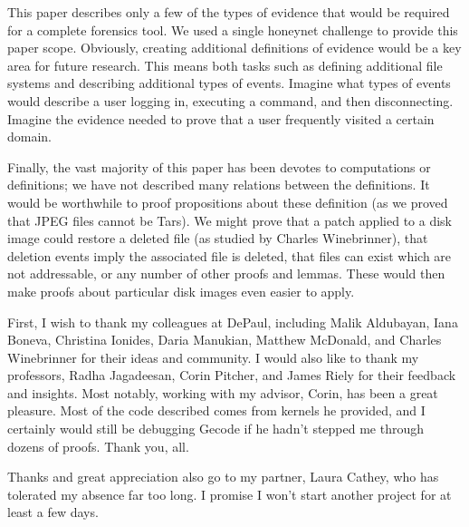 \documentclass[nocopyrightspace]{sigplanconf}
\begin{document}
This paper describes only a few of the types of evidence that would be
required for a complete forensics tool. We used a single honeynet challenge to
provide this paper scope. Obviously, creating additional definitions of
evidence would be a key area for future research. This means both tasks such
as defining additional file systems and describing additional types of events.
Imagine what types of events would describe a user logging in, executing a
command, and then disconnecting. Imagine the evidence needed to prove that a
user frequently visited a certain domain.

Finally, the vast majority of this paper has been devotes to computations or
definitions; we have not described many relations between the definitions. It
would be worthwhile to proof propositions about these definition (as we proved
that JPEG files cannot be Tars). We might prove that a patch applied to a disk
image could restore a deleted file (as studied by Charles Winebrinner), that
deletion events imply the associated file is deleted, that files can exist
which are not addressable, or any number of other proofs and lemmas. These
would then make proofs about particular disk images even easier to apply.

\acks
First, I wish to thank my colleagues at DePaul, including Malik Aldubayan,
Iana Boneva, Christina Ionides, Daria Manukian, Matthew McDonald, and Charles
Winebrinner for their ideas and community. I would also like to thank my
professors, Radha Jagadeesan, Corin Pitcher, and James Riely for their
feedback and insights. Most notably, working with my advisor, Corin, has been
a great pleasure. Most of the code described comes from kernels he provided,
and I certainly would still be debugging Gecode if he hadn't stepped me
through dozens of proofs. Thank you, all.

Thanks and great appreciation also go to my partner, Laura Cathey, who has
tolerated my absence far too long. I promise I won't start another project for
at least a few days.




\end{document}
